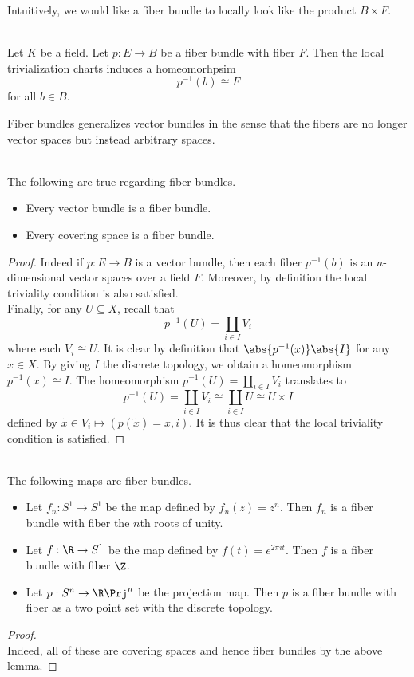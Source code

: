 \documentclass[a4paper]{article}
\begin{document}
Intuitively, we would like a fiber bundle to locally look like the product $B\times F$. 

\begin{lmm}{}{}\\
Let $K$ be a field. Let $p:E\to B$ be a fiber bundle with fiber $F$. Then the local trivialization charts induces a homeomorhpsim $$p^{-1}(b)\cong F$$ for all $b\in B$. 
\end{lmm}

Fiber bundles generalizes vector bundles in the sense that the fibers are no longer vector spaces but instead arbitrary spaces. 

\begin{lmm}{}{}\\
The following are true regarding fiber bundles. 
\begin{itemize}
\item Every vector bundle is a fiber bundle. 
\item Every covering space is a fiber bundle. 
\end{itemize}
\begin{proof}
Indeed if $p:E\to B$ is a vector bundle, then each fiber $p^{-1}(b)$ is an $n$-dimensional vector spaces over a field $F$. Moreover, by definition the local triviality condition is also satisfied. \\

Finally, for any $U\subseteq X$, recall that $$p^{-1}(U)=\coprod_{i\in I}V_i$$ where each $V_i\cong U$. It is clear by definition that $\abs{p^{-1}(x)}\abs{I}$ for any $x\in X$. By giving $I$ the discrete topology, we obtain a homeomorphism $p^{-1}(x)\cong I$. The homeomorphism $p^{-1}(U)=\coprod_{i\in I}V_i$ translates to $$p^{-1}(U)=\coprod_{i\in I}V_i\cong\coprod_{i\in I}U\cong U\times I$$ defined by $\tilde{x}\in V_i\mapsto(p(\tilde{x})=x,i)$. It is thus clear that the local triviality condition is satisfied. 
\end{proof}
\end{lmm}

\begin{eg}{}{}\\
The following maps are fiber bundles. 
\begin{itemize}
\item Let $f_n:S^1\to S^1$ be the map defined by $f_n(z)=z^n$. Then $f_n$ is a fiber bundle with fiber the $n$th roots of unity. 
\item Let $f:\R\to S^1$ be the map defined by $f(t)=e^{2\pi it}$. Then $f$ is a fiber bundle with fiber $\Z$. 
\item Let $p:S^n\to\R\Prj^n$ be the projection map. Then $p$ is a fiber bundle with fiber as a two point set with the discrete topology. 
\end{itemize}
\begin{proof}\\
Indeed, all of these are covering spaces and hence fiber bundles by the above lemma. 
\end{proof}
\end{eg}
\end{document}
